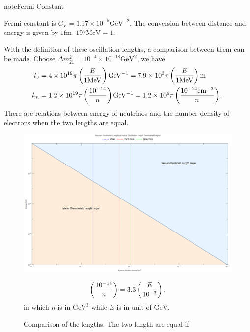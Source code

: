 \documentclass[letterpaper,12pt,english]{sphinxmanual}
\begin{document}
\begin{notice}{note}{Fermi Constant}

Fermi constant is \(G_F=1.17\times 10^{-5}\mathrm{GeV^{-2}}\). The conversion between distance and energy is given by \(1\mathrm{fm}\cdot 197\mathrm{MeV}=1\).
\end{notice}

With the definition of these oscillation lengths, a comparison between them can be made. Choose \(\Delta m_{21}^2=10^{-4}\times 10^{-18}\mathrm{GeV^{2}}\), we have
\begin{gather}
\begin{split}l_v &= 4\times 10^{19}\pi \left( \frac{E}{1 \mathrm{MeV} } \right) \mathrm{GeV^{-1}} = 7.9\times 10^3 \pi   \left( \frac{E}{1 \mathrm{MeV} } \right)\mathrm{m}  \\
l_m &=  1.2\times 10^{19}\pi \left( \frac{10^{-14}}{n} \right) \mathrm{GeV^{-1}} = 1.2\times 10^4\pi \left( \frac{10^{-24}\mathrm{cm^{-3}}}{n} \right) .\end{split}\notag
\end{gather}
There are relations between energy of neutrinos and the number density of electrons when the two lengths are equal.
\begin{figure}[htbp]
\centering
\capstart

\includegraphics{comparisonVacOscLengthMatterLength.png}
\caption{Comparison of the lengths. The two length are equal if}{\small \begin{gather}
\begin{split}\left(\frac{10^{-14}}{n} \right) = 3.3 \left( \frac{E}{10^{-3}}\right),\end{split}\notag
\end{gather}
in which \(n\) is in \(\mathrm{GeV^3}\) while \(E\) is in unit of \(\mathrm{GeV}\).
}\end{figure}
\end{document}
